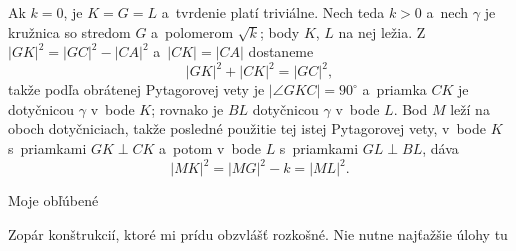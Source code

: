 {    Ak $k = 0$, je $K = G = L$ a~tvrdenie platí triviálne. Nech teda $k > 0$ a~nech $\gamma$ je kružnica so stredom $G$ a~polomerom $\sqrt k$; body $K$, $L$ na nej ležia. Z~$|GK|^2 = |GC|^2 - |CA|^2$ a~$|CK| = |CA|$ dostaneme
    $$
    |GK|^2 + |CK|^2 = |GC|^2,
    $$
    takže podľa obrátenej Pytagorovej vety je $|\angle GKC| = 90^\circ$ a~priamka $CK$ je dotyčnicou $\gamma$ v~bode $K$; rovnako je $BL$ dotyčnicou $\gamma$ v~bode $L$. Bod $M$ leží na oboch dotyčniciach, takže posledné použitie tej istej Pytagorovej vety, v~bode $K$ s~priamkami $GK \perp CK$ a~potom v~bode $L$ s~priamkami $GL \perp BL$, dáva
    $$
    |MK|^2 = |MG|^2 - k = |ML|^2.
    $$
}

\secc Moje obľúbené

Zopár konštrukcií, ktoré mi prídu obzvlášť rozkošné. Nie nutne najťažšie úlohy tu \SlightSmile{}

